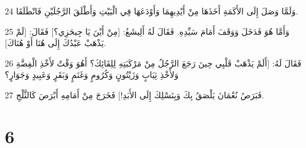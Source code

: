 \par 24 وَلَمَّا وَصَلَ إِلَى الأَكَمَةِ أَخَذَهَا مِنْ أَيْدِيهِمَا وَأَوْدَعَهَا فِي الْبَيْتِ وَأَطْلَقَ الرَّجُلَيْنِ فَانْطَلَقَا.
\par 25 وَأَمَّا هُوَ فَدَخَلَ وَوَقَفَ أَمَامَ سَيِّدِهِ. فَقَالَ لَهُ أَلِيشَعُ: [مِنْ أَيْنَ يَا جِيحَزِي؟] فَقَالَ: [لَمْ يَذْهَبْ عَبْدُكَ إِلَى هُنَا أَوْ هُنَاكَ].
\par 26 فَقَالَ لَهُ: [أَلَمْ يَذْهَبْ قَلْبِي حِينَ رَجَعَ الرَّجُلُ مِنْ مَرْكَبَتِهِ لِلِقَائِكَ؟ أَهُوَ وَقْتٌ لأَخْذِ الْفِضَّةِ وَلأَخْذِ ثِيَابٍ وَزَيْتُونٍ وَكُرُومٍ وَغَنَمٍ وَبَقَرٍ وَعَبِيدٍ وَجَوَارٍ؟
\par 27 فَبَرَصُ نُعْمَانَ يَلْصَقُ بِكَ وَبِنَسْلِكَ إِلَى الأَبَدِ!] فَخَرَجَ مِنْ أَمَامِهِ أَبْرَصَ كَالثَّلْجِ.

\chapter{6}

